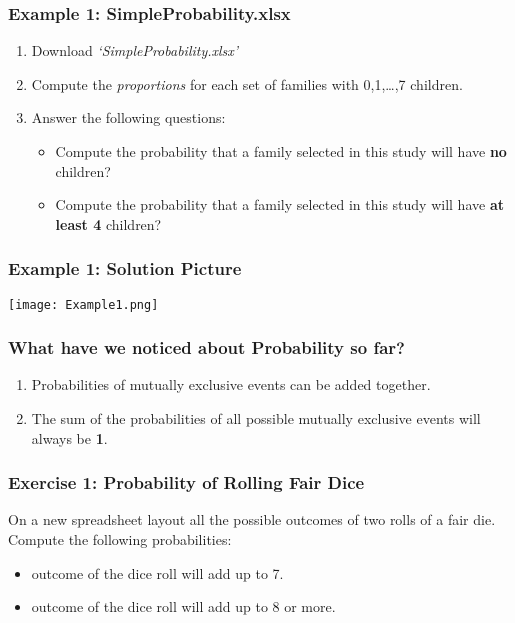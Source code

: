 \documentclass[12pt]{beamer}
\begin{document}
	\begin{frame}
		\frametitle{Example 1: SimpleProbability.xlsx}
		\begin{enumerate}
			\item Download \textit{`SimpleProbability.xlsx'}
			\item Compute the \textit{proportions} for each set of families with 0,1,\ldots,7 children.
			\item Answer the following questions:
			\begin{itemize}
				\item Compute the probability that a family selected in this study will have \textbf{no} children?
				\item Compute the probability that a family selected in this study will have \textbf{at least 4} children?
			\end{itemize}
	\end{enumerate}
	\end{frame}
	\begin{frame}
		\frametitle{Example  1: Solution Picture}
		\begin{center}
			\texttt{[image: Example1.png]}
		\end{center}
	\end{frame}
	\begin{frame}
		\frametitle{What have we noticed about Probability so far?}
		\begin{enumerate}
			\item Probabilities of mutually exclusive events can be added together.
			\item The sum of the probabilities of all possible mutually exclusive events will always be \textbf{1}.
		\end{enumerate}
	\end{frame}
	\begin{frame}
		\frametitle{Exercise 1: Probability of Rolling Fair Dice}
		On a new spreadsheet layout all the possible outcomes of two rolls of a fair die.\\
		Compute the following probabilities:
		\begin{itemize}
			\item outcome of the dice roll will add up to 7.
			\item outcome of the dice roll will add up to 8 or more.
		\end{itemize}
	\end{frame}
\end{document}
